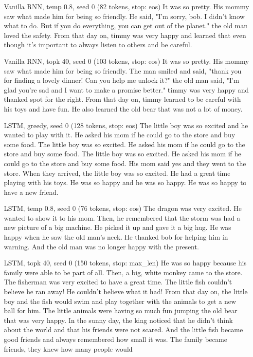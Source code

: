 \begin{modelout}{Vanilla RNN, temp 0.8, seed 0 (82 tokens, stop: eos)}
\small It was so pretty. His mommy saw what made him for being so friendly. He said, "I'm sorry, bob. I didn't know what to do. But if you do everything, you can get out of the planet." the old man loved the safety. From that day on, timmy was very happy and learned that even though it's important to always listen to others and be careful.
\end{modelout}

\begin{modelout}{Vanilla RNN, topk 40, seed 0 (103 tokens, stop: eos)}
\small It was so pretty. His mommy saw what made him for being so friendly. The man smiled and said, "thank you for finding a lovely dinner! Can you help me unlock it?" the old man said, "I'm glad you're sad and I want to make a promise better." timmy was very happy and thanked spot for the right. From that day on, timmy learned to be careful with his toys and have fun. He also learned the old bear that was not a lot of money.
\end{modelout}

\begin{modelout}{LSTM, greedy, seed 0 (128 tokens, stop: eos)}
\small The little boy was so excited and he wanted to play with it. He asked his mom if he could go to the store and buy some food. The little boy was so excited. He asked his mom if he could go to the store and buy some food. The little boy was so excited. He asked his mom if he could go to the store and buy some food. His mom said yes and they went to the store. When they arrived, the little boy was so excited. He had a great time playing with his toys. He was so happy and he was so happy. He was so happy to have a new friend.
\end{modelout}

\begin{modelout}{LSTM, temp 0.8, seed 0 (76 tokens, stop: eos)}
\small The dragon was very excited. He wanted to show it to his mom. Then, he remembered that the storm was had a new picture of a big machine. He picked it up and gave it a big hug. He was happy when he saw the old man's neck. He thanked bob for helping him in warning. And the old man was no longer happy with the present.
\end{modelout}

\begin{modelout}{LSTM, topk 40, seed 0 (150 tokens, stop: max\_len)}
\small He was so happy because his family were able to be part of all. Then, a big, white monkey came to the store. The fisherman was very excited to have a great time. The little fish couldn't believe he ran away! He couldn't believe what it had! From that day on, the little boy and the fish would swim and play together with the animals to get a new ball for him. The little animals were having so much fun jumping the old bear that was very happy. In the sunny day, the king noticed that he didn't think about the world and that his friends were not scared. And the little fish became good friends and always remembered how small it was. The family became friends, they knew how many people would
\end{modelout}

